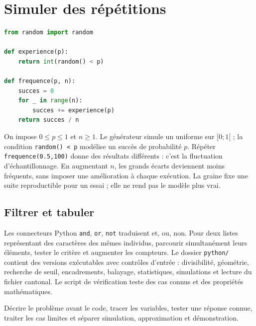 \documentclass[../cours_2de.tex]{subfiles}
\begin{document}
\section{Simuler des répétitions}
\begin{lstlisting}[language=Python]
from random import random

def experience(p):
    return int(random() < p)

def frequence(p, n):
    succes = 0
    for _ in range(n):
        succes += experience(p)
    return succes / n
\end{lstlisting}
On impose $0\leq p\leq1$ et $n\geq1$. Le générateur simule un uniforme sur $[0;1[$ ; la condition \texttt{random() < p} modélise un succès de probabilité $p$.
Répéter \texttt{frequence(0.5,100)} donne des résultats différents : c'est la fluctuation d'échantillonnage. En augmentant $n$, les grands écarts deviennent moins fréquents, sans imposer une amélioration à chaque exécution.
La graine fixe une suite reproductible pour un essai ; elle ne rend pas le modèle plus vrai.
\begin{finchapitre}
\section{Filtrer et tabuler}
Les connecteurs Python \texttt{and}, \texttt{or}, \texttt{not} traduisent et, ou, non. Pour deux listes représentant des caractères des mêmes individus, parcourir simultanément leurs éléments, tester le critère et augmenter les compteurs.
Le dossier \texttt{python/} contient des versions exécutables avec contrôles d'entrée : divisibilité, géométrie, recherche de seuil, encadrements, balayage, statistiques, simulations et lecture du fichier cantonal. Le script de vérification teste des cas connus et des propriétés mathématiques.
\begin{retenir}
Décrire le problème avant le code, tracer les variables, tester une réponse connue, traiter les cas limites et séparer simulation, approximation et démonstration.
\end{retenir}
\end{finchapitre}
\end{document}
